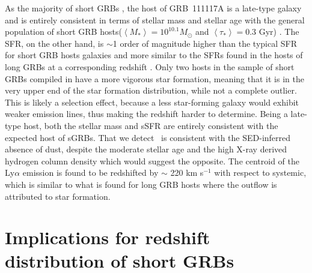 \documentclass{aa}    %
\begin{document}
As the majority of short GRBs \citep{Fong2013b}, the host of GRB~111117A is a late-type galaxy and is entirely consistent in terms of stellar mass and stellar age with the general population of short GRB hosts($\left\langle M _* \right\rangle = 10^{10.1} M_{\odot}$ and $\left\langle \tau _* \right\rangle = 0.3 $ Gyr) \citet{Leibler2010}. The SFR, on the other hand, is $\sim$1 order of magnitude higher than the typical SFR for short GRB hosts galaxies \citep{Berger2014} and more similar to the SFRs found in the hosts of long GRBs at a corresponding redshift \citep{Kruhler2015}. Only two hosts in the sample of short GRBs compiled in \citet{Berger2014} have a more vigorous star formation, meaning that it is in the very upper end of the star formation distribution, while not a complete outlier. This is likely a selection effect, because a less star-forming galaxy would exhibit weaker emission lines, thus making the redshift harder to determine. Being a late-type host, both the stellar mass and sSFR are entirely consistent with the expected host of sGRBs\citep{Behroozi2014}.
That we detect \lya~is consistent with the SED-inferred absence of dust, despite the moderate stellar age and the high X-ray derived hydrogen column density which would suggest the opposite. The centroid of the Ly$\alpha$ emission is found to be redshifted by $\sim$ 220 km s$^{-1}$ with respect to systemic, which is similar to what is found for long GRB hosts \citep{Milvang-Jensen2012a} where the outflow is attributed to star formation.




\section{Implications for redshift distribution of short GRBs}
\end{document}
